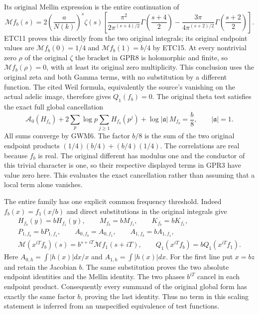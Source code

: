 Its original Mellin expression is the entire continuation of
\begin{equation}\tag{GPR8}
 \mathcal M f_b(s)=
 2\left(\frac a{N(k)}\right)^s\zeta(s)
 \left[
 \frac{\pi^2}{2\pi^{(s+4)/2}}\Gamma\left(\frac{s+4}{2}\right)
 -\frac{3\pi}{4\pi^{(s+2)/2}}\Gamma\left(\frac{s+2}{2}\right)
 \right].
\end{equation}
ETC11 proves this directly from the two original integrals;
its original endpoint values are
$\mathcal M f_b(0)=1/4$ and
$\mathcal M f_b(1)=b/4$ by ETC15.
At every nontrivial zero $\rho$ of the original $\zeta$ the
bracket in GPR8 is holomorphic and finite, so
$\mathcal M f_b(\rho)=0$, with at least its original zero
multiplicity. This conclusion uses the original zeta and both
Gamma terms, with no substitution by a different function.
The cited Weil formula, equivalently the source's vanishing
on the actual adelic image, therefore gives
$Q_1(f_b)=0$. The original theta test satisfies the exact
full global cancellation
\begin{equation}\tag{GPR9}
 \mathcal A_0(H_{f_b})
 +2\sum_p\log p\sum_{j\ge1}H_{f_b}(p^j)
 +\log|\mathfrak a|\,M_{f_b}=\frac b8,\qquad|\mathfrak a|=1.
\end{equation}
All sums converge by GWM6. The factor $b/8$ is the sum of
the two original endpoint products
$(1/4)(b/4)+(b/4)(1/4)$. The correlations are real because
$f_b$ is real. The original different has modulus one and
the conductor of this trivial character is one, so their
respective displayed terms in GPR3 have value zero here.
This evaluates the exact cancellation rather than assuming
that a local term alone vanishes.

The entire family has one explicit common frequency threshold.
Indeed $f_b(x)=f_1(x/b)$ and direct substitutions in the
original integrals give
\begin{equation}\tag{GPR10}
 \begin{gathered}
 H_{f_b}(y)=bH_{f_1}(y),\qquad
 M_{f_b}=bM_{f_1},\qquad K_{f_b}=bK_{f_1},\\
 P_{1,f_b}=bP_{1,f_1},\qquad
 A_{0,f_b}=A_{0,f_1},\qquad A_{1,f_b}=bA_{1,f_1},\\
 \mathcal M(x^{iT}f_b)(s)=b^{s+iT}\mathcal M f_1(s+iT),\qquad
 Q_1(x^{iT}f_b)=bQ_1(x^{iT}f_1).
 \end{gathered}
\end{equation}
Here $A_{0,h}=\int|h(x)|dx/x$ and $A_{1,h}=\int|h(x)|dx$.
For the first line put $x=bz$ and retain the Jacobian $b$.
The same substitution proves the two absolute endpoint
identities and the Mellin identity.
The two phases $b^{iT}$ cancel in each endpoint product.
Consequently every summand of the original global form has
exactly the same factor $b$, proving the last identity.
Thus no term in this scaling statement is inferred from
an unspecified equivalence of test functions.

